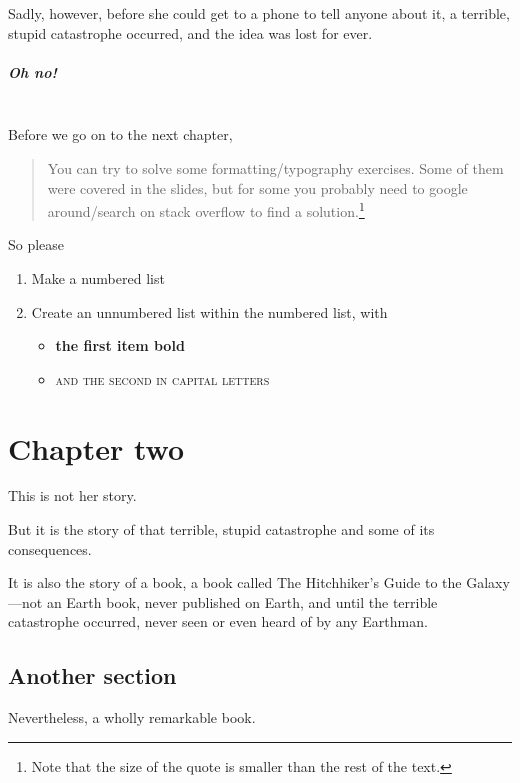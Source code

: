 \documentclass[a4paper, twocolumn, openany]{book}
\begin{document}
	Sadly, however, before she could get to a phone to tell anyone about it, a terrible, stupid catastrophe occurred, and the idea was lost for ever.
	
	\paragraph{Oh no!}~\\

\noindent Before we go on to the next chapter,
	
	\begin{quote}
		\small You can try to solve some formatting/typography exercises. Some of them were covered in the slides, but for some you probably need to google around/search on stack overflow to find a solution.\footnote{Note that the size of the quote is smaller than the rest of the text.}
	\end{quote}
	
\noindent So please
	
	\begin{enumerate}
		\item Make a numbered list
		\item Create an unnumbered list within the numbered list, with
		\begin{itemize}
			\item \textbf{the first item bold}
			\item \textsc{and the second in capital letters}
		\end{itemize}
	\end{enumerate}
	
	\chapter{Chapter two}
	
	\noindent This is not her story.
	
	But it is the story of that terrible, stupid catastrophe and some of its consequences.
	
	It is also the story of a book, a book called The Hitchhiker’s Guide to the Galaxy—not an Earth book, never published on Earth, and until the terrible catastrophe occurred, never seen or even heard of by any Earthman.
	
	\section{Another section}
	
	Nevertheless, a wholly remarkable book.
	
\end{document}
